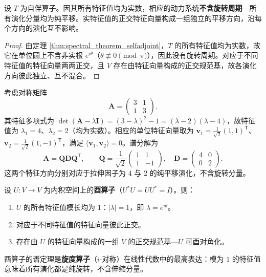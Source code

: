 \begin{corollary}[自伴谱定理与梯度守恒律]\label{cor:selfadjoint_conservation}
设 $T$ 为自伴算子。因其所有特征值均为实数，相应的动力系统\textbf{不含旋转周期}---所有演化分量均为纯平移。实特征值的正交特征向量构成一组独立的平移方向，沿每个方向的演化互不影响。
\end{corollary}

\begin{proof}
由定理 \ref{thm:spectral_theorem_selfadjoint}，$T$ 的所有特征值均为实数，故它在单位圆上不含非实根 $e^{i\theta}$（$\theta \not\equiv 0 \pmod{\pi}$），因此没有旋转周期。对应于不同特征值的特征向量两两正交，且 $V$ 存在由特征向量构成的正交规范基，故各演化方向彼此独立、互不混合。
\end{proof}

\begin{example}\label{ch5_example_eigendecomp_2x2}
考虑对称矩阵
\[
\mathbf{A} = \begin{pmatrix} 3 & 1 \\ 1 & 3 \end{pmatrix}.
\]
其特征多项式为 $\det(\mathbf{A}-\lambda\mathbf{I}) = (3-\lambda)^2 - 1 = (\lambda-2)(\lambda-4)$，故特征值为 $\lambda_1 = 4$、$\lambda_2 = 2$（均为实数）。相应的单位特征向量取为 $\mathbf{v}_1 = \frac{1}{\sqrt2}(1,1)^{\mathsf T}$、$\mathbf{v}_2 = \frac{1}{\sqrt2}(1,-1)^{\mathsf T}$，满足 $\langle \mathbf{v}_1, \mathbf{v}_2 \rangle = 0$。谱分解为
\[
\mathbf{A} = \mathbf{Q}\mathbf{D}\mathbf{Q}^{\mathsf T}, \qquad \mathbf{Q} = \frac{1}{\sqrt2}\begin{pmatrix} 1 & 1 \\ 1 & -1 \end{pmatrix}, \quad \mathbf{D} = \begin{pmatrix} 4 & 0 \\ 0 & 2 \end{pmatrix}.
\]
这两个特征方向分别对应于拉伸因子为 $4$ 与 $2$ 的纯平移演化，不含旋转分量。
\end{example}

\begin{theorem}\label{thm:spectral_theorem_unitary}
设 $U: V \to V$ 为内积空间上的\textbf{酉算子}（$U^* U = U U^* = I$）。则：
\begin{enumerate}[label=(\roman*)]
    \item $U$ 的所有特征值模长均为 $1$：$|\lambda| = 1$，即 $\lambda = e^{i\theta}$。
    \item 对应于不同特征值的特征向量彼此正交。
    \item 存在由 $U$ 的特征向量构成的一组 $V$ 的正交规范基---$U$ 可酉对角化。
\end{enumerate}
酉算子的谱定理是\textbf{旋度算子}（$i$-对称）在线性代数中的最高表达：模为 $1$ 的特征值意味着所有演化都是纯旋转，不含伸缩分量。
\end{theorem}

